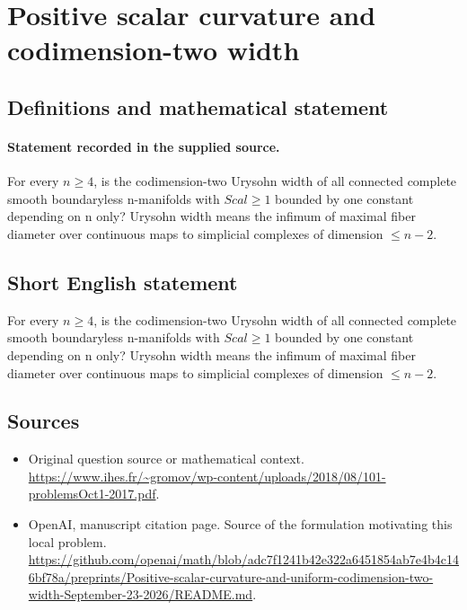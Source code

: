 \documentclass[11pt]{article}
\begin{document}
\section*{Positive scalar curvature and codimension-two width}\label{statement}
\subsection{Definitions and mathematical statement}
\paragraph{Statement recorded in the supplied source.}
For every $n\geq 4$, is the codimension-two Urysohn width of all connected complete smooth boundaryless n-manifolds with $Scal\geq 1$ bounded by one constant depending on n only? Urysohn width means the infimum of maximal fiber diameter over continuous maps to simplicial complexes of dimension $\leq n-2$.
\subsection{Short English statement}
For every $n\geq 4$, is the codimension-two Urysohn width of all connected complete smooth boundaryless n-manifolds with $Scal\geq 1$ bounded by one constant depending on n only? Urysohn width means the infimum of maximal fiber diameter over continuous maps to simplicial complexes of dimension $\leq n-2$.
\subsection{Sources}
\begin{itemize}
\item[S1] Original question source or mathematical context.
\url{https://www.ihes.fr/~gromov/wp-content/uploads/2018/08/101-problemsOct1-2017.pdf}.
\item[S2] OpenAI, manuscript citation page. Source of the formulation motivating this local problem.
\url{https://github.com/openai/math/blob/adc7f1241b42e322a6451854ab7e4b4c146bf78a/preprints/Positive-scalar-curvature-and-uniform-codimension-two-width-September-23-2026/README.md}.
\end{itemize}
\end{document}
